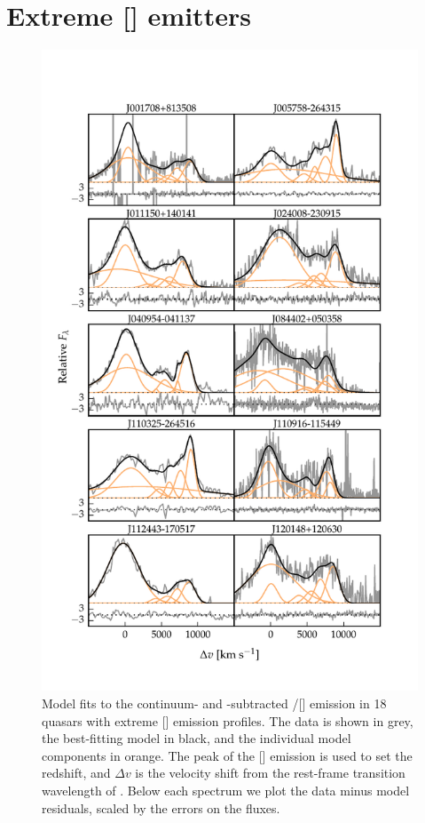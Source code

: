 \section{Extreme [] emitters}
\label{sec:extreme_oiii}

\begin{figure}
    \centering
    \includegraphics[width=\columnwidth]{figures/chapter04/example_spectrum_grid_extreme_oiii_1.pdf} 
    \caption[{Model fits to the continuum- and -subtracted \hbns/[] emission in 18 quasars with extreme [] emission profiles.}]{Model fits to the continuum- and -subtracted \hbns/[] emission in 18 quasars with extreme [] emission profiles. The data is shown in grey, the best-fitting model in black, and the individual model components in orange. The peak of the [] emission is used to set the redshift, and $\Delta{v}$ is the velocity shift from the rest-frame transition wavelength of \hbns. Below each spectrum we plot the data minus model residuals, scaled by the errors on the fluxes.}     
    \label{fig:example_spectrum_grid_extreme_oiii}
\end{figure}

